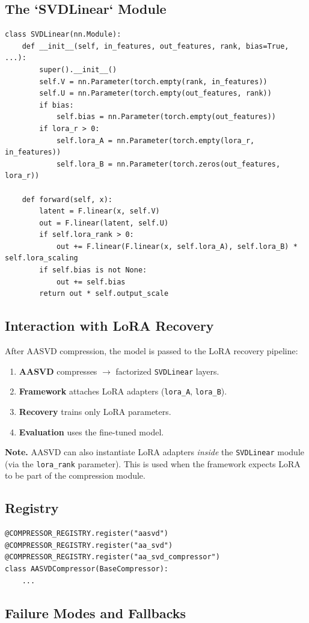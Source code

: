 \subsection{The `SVDLinear` Module}

\begin{lstlisting}
class SVDLinear(nn.Module):
    def __init__(self, in_features, out_features, rank, bias=True, ...):
        super().__init__()
        self.V = nn.Parameter(torch.empty(rank, in_features))
        self.U = nn.Parameter(torch.empty(out_features, rank))
        if bias:
            self.bias = nn.Parameter(torch.empty(out_features))
        if lora_r > 0:
            self.lora_A = nn.Parameter(torch.empty(lora_r, in_features))
            self.lora_B = nn.Parameter(torch.zeros(out_features, lora_r))
    
    def forward(self, x):
        latent = F.linear(x, self.V)
        out = F.linear(latent, self.U)
        if self.lora_rank > 0:
            out += F.linear(F.linear(x, self.lora_A), self.lora_B) * self.lora_scaling
        if self.bias is not None:
            out += self.bias
        return out * self.output_scale
\end{lstlisting}

\subsection{Interaction with LoRA Recovery}

After AASVD compression, the model is passed to the LoRA recovery pipeline:

\begin{enumerate}
\item \textbf{AASVD} compresses $\to$ factorized \texttt{SVDLinear} layers.
\item \textbf{Framework} attaches LoRA adapters (\texttt{lora\_A}, \texttt{lora\_B}).
\item \textbf{Recovery} trains only LoRA parameters.
\item \textbf{Evaluation} uses the fine-tuned model.

\end{enumerate}
\textbf{Note.} AASVD can also instantiate LoRA adapters \textit{inside} the \texttt{SVDLinear} 
module (via the \texttt{lora\_rank} parameter). This is used when the framework 
expects LoRA to be part of the compression module.

\subsection{Registry}

\begin{lstlisting}
@COMPRESSOR_REGISTRY.register("aasvd")
@COMPRESSOR_REGISTRY.register("aa_svd")
@COMPRESSOR_REGISTRY.register("aa_svd_compressor")
class AASVDCompressor(BaseCompressor):
    ...
\end{lstlisting}

\subsection{Failure Modes and Fallbacks}
